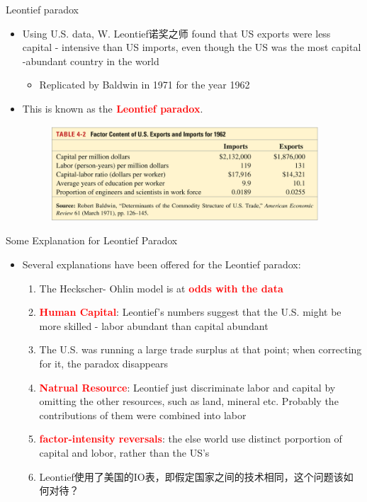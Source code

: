 \documentclass[10pt,hyperref={CJKbookmarks=true},xcolor=dvipsnames,aspectratio=169]{beamer}
\begin{document}
\begin{frame}{Leontief paradox}

\begin{itemize}
\item Using U.S. data, W. Leontief诺奖之师 found that US exports were less capital
- intensive than US imports, even though the US was the most capital
-abundant country in the world 

\begin{itemize}
\item Replicated by Baldwin in 1971 for the year 1962 
\end{itemize}
\item This is known as the\textbf{\textcolor{red}{{} Leontief paradox}}. 
\begin{figure}
\begin{centering}
\includegraphics[width=10cm]{fig/ho/lec5-15}
\par\end{centering}

\end{figure}

\end{itemize}
\end{frame}

\begin{frame}{Some Explanation for Leontief Paradox}

\begin{itemize}
\item Several explanations have been offered for the Leontief paradox: 

\begin{enumerate}
\item The Heckscher- Ohlin model is at \textbf{\textcolor{red}{odds with
the data}} 
\item \textbf{\textcolor{red}{Human Capital}}: Leontief’s numbers suggest
that the U.S. might be more skilled - labor abundant than capital
abundant 
\item The U.S. was running a large trade surplus at that point; when correcting
for it, the paradox disappears 
\item \textbf{\textcolor{red}{Natrual Resource}}: Leontief just discriminate
labor and capital by omitting the other resources, such as land, mineral
etc. Probably the contributions of them were combined into labor
\item \textbf{\textcolor{red}{factor-intensity reversals}}: the else world
use distinct porportion of capital and lobor, rather than the US's
\item Leontief使用了美国的IO表，即假定国家之间的技术相同，这个问题该如何对待？
\end{enumerate}
\end{itemize}
\end{frame}
\end{document}
